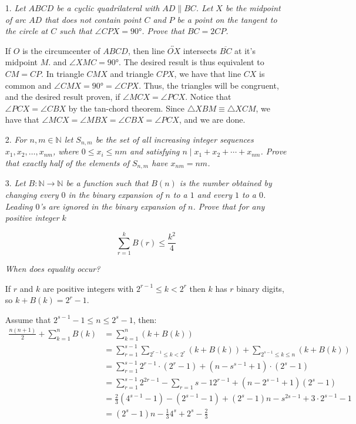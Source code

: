 \documentclass{article}
\begin{document}
\begin{enumerate}

\medskip
\item[1.] %
\textit{Let $ABCD$ be a cyclic quadrilateral with $AD \parallel BC$. Let $X$ be the midpoint of arc $AD$ that does not contain point $C$ and $P$ be a point on the tangent to the circle at $C$ such that $\angle CPX = 90 \si{\degree} $. Prove that $BC = 2 CP$.}

If $O$ is the circumcenter of $ABCD$, then line $\overleftrightarrow{OX}$ intersects $\overline{BC}$ at it's midpoint $M$. and $\angle XMC = 90 \si{\degree}$. The desired result is thus equivalent to $CM = CP$. In triangle $CMX$ and triangle $CPX$, we have that line $CX$ is common and $\angle CMX = 90 \si{\degree} = \angle CPX$. Thus, the triangles will be congruent, and the desired result proven, if $\angle MCX = \angle PCX$. Notice that $\angle PCX = \angle CBX$ by the tan-chord theorem. Since $\triangle XBM \equiv \triangle XCM$, we have that $\angle MCX = \angle MBX = \angle CBX = \angle PCX$, and we are done.


\medskip
\item[2.] %
\textit{For $n,m\in\mathbb{N}$ let $S_{n,m}$ be the set of all increasing integer sequences $x_{1},x_{2},\ldots,x_{nm}$, where $0\leq x_i\leq nm$ and satisfying $n \mid x_{1} + x_{2} + \cdots +x_{nm}$. Prove that exactly half of the elements of $S_{n,m}$ have $x_{nm}=nm$.}



\medskip
\item[3.] %
\textit{Let $B: \mathbb{N} \rightarrow \mathbb{N}$ be a function such that $B(n)$ is the number obtained by changing every $0$ in the binary expansion of $n$ to a $1$ and every $1$ to a $0$. Leading $0$'s are ignored in the binary expansion of $n$. Prove that for any positive integer $k$}

$$\sum_{r=1}^{k} B(r) \le \frac{k^2}{4}$$

\textit{When does equality occur?}

If $r$ and $k$ are positive integers with $2^{r - 1} \le k < 2^r$ then $k$ has $r$ binary digits, so $k + B(k) = 2^r - 1$.

Assume that $2^{s - 1} - 1 \le n \le 2^s - 1$, then:
\begin{align*}
\frac{n(n + 1)}{2} + \sum_{k = 1}^{n} B(k) &= \sum_{k = 1}^{n} (k + B(k)) \\
&= \sum_{r = 1}^{s - 1} \sum_{2^{r - 1} \le k < 2^r} (k + B(k)) + \sum_{2^{s - 1} \le k \le n} (k + B(k)) \\
&= \sum_{r = 1}^{s - 1} 2^{r - 1} \cdot (2^r - 1) + (n - s^{s - 1} + 1) \cdot (2^s - 1) \\
&= \sum_{r = 1}^{s - 1} 2^{2r - 1} - \sum_{r = 1}{s - 1} 2^{r - 1} + (n - 2^{s - 1} + 1)(2^s - 1) \\
&= \frac{2}{3} (4^{s - 1} - 1) - (2^{s - 1} - 1) + (2^s - 1)n - s^{2s - 1} + 3 \cdot 2^{s - 1} - 1 \\
&= (2^s - 1)n - \frac{1}{3} 4^s + 2^s - \frac{2}{3}
\end{align*}


\end{enumerate}
\end{document}
